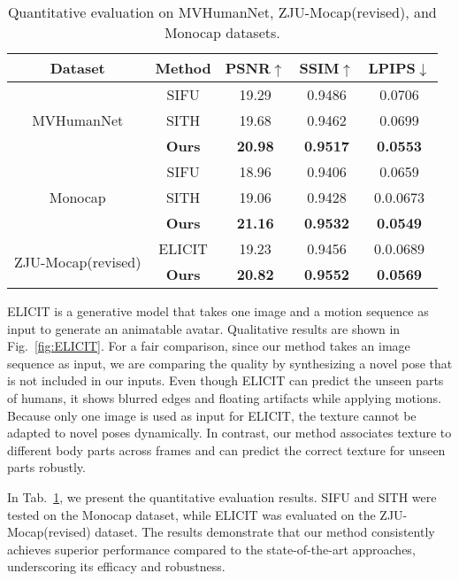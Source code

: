 \begin{table}[!t]
\centering
\renewcommand{\arraystretch}{1.5}

\begin{tabular}{c|c|ccc}
\hline
Dataset                    & Method & PSNR$\uparrow$&SSIM$\uparrow$&LPIPS$\downarrow$  \\ \hline
\multirow{3}{*}{MVHumanNet}   & SIFU   &19.29&0.9486&0.0706\\
                            & SITH   &19.68&0.9462&0.0699\\
                        &\textbf{Ours} & \textbf{20.98} & \textbf{0.9517} & \textbf{0.0553} \\ \hline  
\multirow{3}{*}{Monocap}   & SIFU   &18.96&0.9406&0.0659\\
                            & SITH   &19.06&0.9428&0.0.0673\\
                        &\textbf{Ours} & \textbf{21.16} & \textbf{0.9532} & \textbf{0.0549} \\ \hline  
\multirow{2}{*}{ZJU-Mocap(revised)} & ELICIT &19.23&0.9456&0.0.0689\\
                           &\textbf{Ours} & \textbf{20.82} & \textbf{0.9552} & \textbf{0.0569}  \\ \hline
\end{tabular}
\caption{Quantitative evaluation on MVHumanNet, ZJU-Mocap(revised), and Monocap datasets.}
\vspace{-3mm}
  \label{tab:exp}
\end{table}
ELICIT is a generative model that takes one image and a motion sequence as input to generate an animatable avatar. Qualitative results are shown in Fig.~\ref{fig:ELICIT}. For a fair comparison, since our method takes an image sequence as input, we are comparing the quality by synthesizing a novel pose that is not included in our inputs. Even though ELICIT can predict the unseen parts of humans, it shows blurred edges and floating artifacts while applying motions. Because only one image is used as input for ELICIT, the texture cannot be adapted to novel poses dynamically. In contrast, our method associates texture to different body parts across frames and can predict the correct texture for unseen parts robustly.

In Tab.~\ref{tab:exp}, we present the quantitative evaluation results. SIFU and SITH were tested on the Monocap dataset, while ELICIT was evaluated on the ZJU-Mocap(revised) dataset. The results demonstrate that our method consistently achieves superior performance compared to the state-of-the-art approaches, underscoring its efficacy and robustness.



